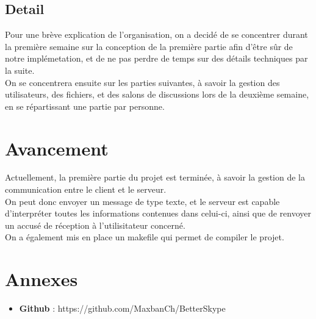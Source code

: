 \documentclass{cs-moi}
\begin{document}
\subsection{Detail}
Pour une brève explication de l'organisation, on a decidé de se concentrer durant la première semaine sur la conception de la première partie afin d'être sûr de notre implémetation, et de ne pas perdre de temps sur des détails techniques par la suite.\\
On se concentrera ensuite sur les parties suivantes, à savoir la gestion des utilisateurs, des fichiers, et des salons de discussions lors de la deuxième semaine, en se répartissant une partie par personne.\\

\section{Avancement}
Actuellement, la première partie du projet est terminée, à savoir la gestion de la communication entre le client et le serveur.\\
On peut donc envoyer un message de type texte, et le serveur est capable d'interpréter toutes les informations contenues dans celui-ci, ainsi que de renvoyer un accusé de réception à l'utilisitateur concerné.\\

On a également mis en place un makefile qui permet de compiler le projet.


\section{Annexes}
\begin{itemize}
    \item \textbf{Github} : https://github.com/MaxbanCh/BetterSkype
\end{itemize}
\end{document}
